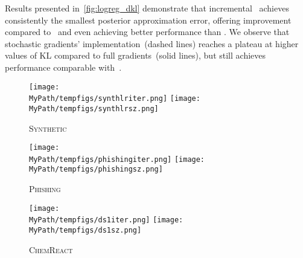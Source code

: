 Results presented in~\cref{fig:logreg_dkl} demonstrate that incremental \psvi~achieves consistently the smallest posterior approximation error, offering improvement compared to \sparsevi~and even achieving better performance than \gigao. We observe that stochastic gradients' implementation~(dashed lines) reaches a plateau at higher values of KL compared to full gradients~(solid lines), but still achieves performance comparable with~\gigao.

\begin{figure*}[!htp]
	\centering
	\begin{subfigure}[]{\textwidth}
		\centering
		\caption*{\textsc{Synthetic}}
		\vspace*{-0.2cm}
		\texttt{[image: \\MyPath/tempfigs/synthlriter.png]} \hfill 
		\texttt{[image: \\MyPath/tempfigs/synthlrsz.png]}%
	\end{subfigure}\hfill\qquad
	\begin{subfigure}[]{\textwidth}
		\centering
		\caption*{\textsc{Phishing}}
		\vspace*{-0.2cm}
		\texttt{[image: \\MyPath/tempfigs/phishingiter.png]} \hfill
		\texttt{[image: \\MyPath/tempfigs/phishingsz.png]}%
	\end{subfigure}\hfill\qquad
	\begin{subfigure}[]{\textwidth}
		\centering
		\caption*{\textsc{ChemReact}}
		\vspace*{-0.2cm}
		\texttt{[image: \\MyPath/tempfigs/ds1iter.png]}
		\hfill
		\texttt{[image: \\MyPath/tempfigs/ds1sz.png]}%
	\end{subfigure}
	\caption{Comparison of incremental \psvi~and \sparsevi~approximate posterior
		quality vs iterations of incremental construction~(\emph{left}) and  coreset
		size~(\emph{right}) for logistic regression on small-scale experiment. With dashed lines is displayed the posterior quality achieved
		by incremental \psvi~and \sparsevi~constructions using gradients computed on random data subsets of size $256$.}
	\label{fig:logreg_dkl}
\end{figure*}






